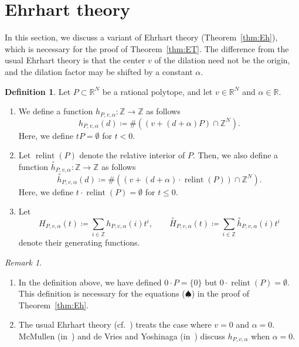 \documentclass[10pt,a4paper]{amsart}
\theoremstyle{plain}
\theoremstyle{definition}
\newtheorem{defi}[cdrthm]{Definition}
\theoremstyle{remark}
\newtheorem{rmk}[cdrthm]{Remark}
\begin{document}
\section{Ehrhart theory}\label{section:ET}
In this section, we discuss a variant of Ehrhart theory (Theorem~\ref{thm:Eh}), which is necessary for the proof of Theorem~\ref{thm:ET}. The difference from the usual Ehrhart theory is that the center $v$ of the dilation need not be the origin, and the dilation factor may be shifted by a constant $\alpha$. 

\begin{defi}
Let $P \subset \mathbb{R}^N$ be a rational polytope, and let $v \in \mathbb{R}^N$ and $\alpha \in \mathbb{R}$. 

\begin{enumerate}
\item
We define a function $h_{P, v, \alpha}: \mathbb{Z} \to \mathbb{Z}$ as follows
\[
h_{P, v, \alpha}(d) \coloneqq  \# \left( (v + (d + \alpha) P) \cap \mathbb{Z}^N \right). 
\]
Here, we define $t P = \emptyset$ for $t < 0$. 

\item
Let $\operatorname{relint}(P)$ denote the relative interior of $P$. 
Then, we also define a function $\overset{\circ}{h} _{P, v, \alpha}: \mathbb{Z} \to \mathbb{Z}$ as follows
\[
\overset{\circ}{h}_{P, v, \alpha}(d) \coloneqq  \# \left( (v + (d + \alpha) \cdot \operatorname{relint}({P})) \cap \mathbb{Z}^N \right). 
\]
Here, we define $t \cdot \operatorname{relint}({P}) = \emptyset$ for $t \le 0$. 

\item
Let  
\[
H_{P, v, \alpha} (t) \coloneqq  \sum _{i \in \mathbb{Z}} h_{P, v, \alpha}(i) t^i, \qquad
\overset{\circ}{H}_{P, v, \alpha} (t) \coloneqq  \sum _{i \in \mathbb{Z}} \overset{\circ}{h}_{P, v, \alpha}(i) t^i
\]
denote their generating functions. 
\end{enumerate}
\end{defi}

\begin{rmk}  \hfill
\begin{enumerate}
\item
In the definition above, we have defined $0 \cdot P = \{ 0 \}$ but $0 \cdot \operatorname{relint}({P}) = \emptyset$. This definition is necessary for the equations ($\spadesuit$) in the proof of Theorem~\ref{thm:Eh}.

\item
The usual Ehrhart theory (cf.~\cite{BR}) treats the case where $v = 0$ and $\alpha = 0$. 
McMullen (in~\cite{McM78}) and de Vries and Yoshinaga (in~\cite[Section 3]{dVY21}) discuss $h_{P, v, \alpha}$ when $\alpha = 0$. 
\end{enumerate}
\end{rmk}
\end{document}
